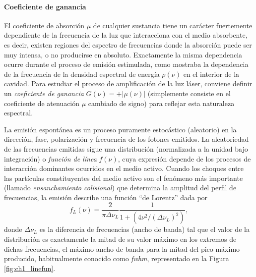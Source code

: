 \paragraph{Coeficiente de ganancia}
El coeficiente de absorción $\mu$ de cualquier sustancia tiene un carácter fuertemente dependiente de la frecuencia de la luz que interacciona con el medio absorbente, es decir, existen regiones del espectro de frecuencias donde la absorción puede ser muy intensa, o no producirse en absoluto. Exactamente la misma dependencia ocurre durante el proceso de emisión estimulada, como mostraba la dependencia de la frecuencia de la densidad espectral de energía $\rho(\nu)$ en el interior de la cavidad. Para estudiar el proceso de amplificación de la luz láser, conviene definir un \emph{coeficiente de ganancia} $G(\nu) = +|\mu(\nu)|$ (simplemente consiste en el coeficiente de atenuación $\mu$ cambiado de signo) para reflejar esta naturaleza espectral.

La emisión espontánea es un proceso puramente estocástico (aleatorio) en la dirección, fase, polarización y frecuencia de los fotones emitidos. La aleatoriedad de las frecuencias emitidas sigue una distribución (normalizada a la unidad bajo integración) o \emph{función de línea} $f(\nu)$, cuya expresión depende de los procesos de interacción dominantes ocurridos en el medio activo. Cuando los choques entre las partículas constituyentes del medio activo son el fenómeno más importante (llamado \emph{ensanchamiento colisional}) que determina la amplitud del perfil de frecuencias, la emisión describe una función \enquote{de Lorentz} dada por \autocite{Milonni1988,Tallents2003,Svelto2010}
\begin{equation}\label{eq:2.10}
  f_{L}(\nu) = \frac{2}{\pi \Delta \nu_{L}}\frac{1}{1 + \left(4 \nu^{2}/(\Delta \nu_{L})^{2}\right)},
\end{equation}
donde $\Delta \nu_{L}$ es la diferencia de frecuencias (ancho de banda) tal que el valor de la distribución es exactamente la mitad de su valor máximo en los extremos de dichas frecuencias, el máximo ancho de banda para la mitad del pico máximo producido, habitualmente conocido como \emph{\acrfull{fwhm}}, representado en la Figura \ref{fig:ch1_linefun}. 

